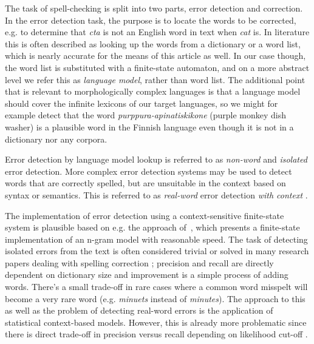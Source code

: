 \documentclass[a4paper,12pt]{article}
\begin{document}
The task of spell-checking is split into two parts, error detection and
correction. In the error detection task, the purpose is to locate the words to
be corrected, e.g. to determine that \emph{cta} is not an English word in text
when \emph{cat} is. In literature this is often described as looking up the
words from a dictionary or a word list, which is nearly accurate for the means
of this article as well. In our case though, the word list is substituted with
a finite-state automaton, and on a more abstract level we refer this as
\emph{language model}, rather than word list. The additional point that is
relevant to morphologically complex languages is that a language model should
cover the infinite lexicons of our target languages, so we might for
example detect that the word \emph{purppura-apinatiskikone} (purple monkey dish
washer) is a plausible word in the Finnish language even though it is not in a
dictionary nor any corpora.

Error detection by language model lookup is referred to as \emph{non-word} and
\emph{isolated} error detection. More complex error detection systems may be
used to detect words that are correctly spelled, but are unsuitable in the
context based on syntax or semantics. This is referred to as \emph{real-word}
error detection \emph{with context} \cite{mays/1991}.

The implementation of error detection using a context-sensitive finite-state
system is plausible based on e.g. the approach of~\cite{silfverberg/2010},
which presents a finite-state implementation of an n-gram model with reasonable
speed. The task of detecting isolated errors from the text is often considered
trivial or solved in many research papers dealing with spelling correction
\cite[e.g.][]{otero/2007}; precision and recall are directly dependent on
dictionary size and improvement is a simple process of adding words.  There's a
small trade-off in rare cases where a common word misspelt will become a very
rare word (e.g. \emph{minuets} instead of
\emph{minutes}\cite{kukich1992techniques}). The approach to this as well as the
problem of detecting real-word errors is the application of statistical
context-based models.  However, this is already more problematic since there is
direct trade-off in precision versus recall depending on likelihood cut-off
\cite[]{hirst2008evaluation,wilcoxohearn2008realword}.
\end{document}
